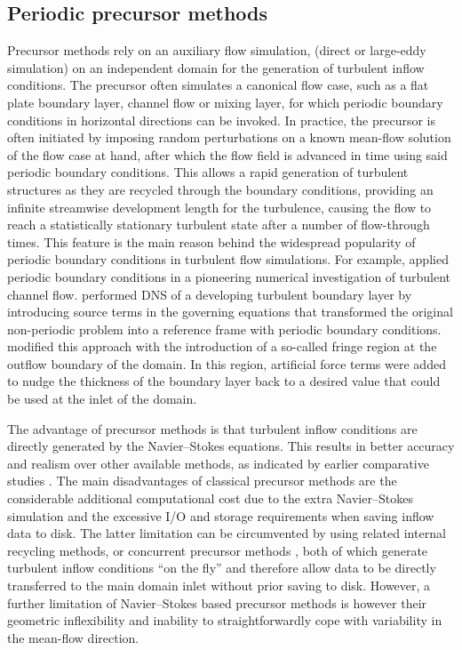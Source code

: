 	\subsection{Periodic precursor methods}
	Precursor methods rely on an auxiliary flow simulation, (direct or large-eddy simulation) on an independent domain for the generation of turbulent inflow conditions.
	The precursor often simulates a canonical flow case, such as a flat plate boundary layer, channel flow or mixing layer, for which periodic
	boundary conditions in horizontal directions can be invoked. In practice, the precursor is often initiated by imposing random perturbations on a known mean-flow solution of the flow case at hand, after which the flow field is advanced in time using said periodic boundary conditions. This allows a rapid generation of turbulent structures as they are recycled through the boundary conditions, providing an infinite streamwise development length for the turbulence, causing the flow to reach a statistically stationary turbulent state after a number of flow-through times. This feature is the main reason behind the widespread popularity of periodic boundary conditions in turbulent flow simulations. For example, \cite{kimmoin} applied
	periodic boundary conditions in a pioneering numerical investigation of turbulent channel flow. \cite{spalart1988direct} performed DNS of a developing turbulent boundary layer by introducing source terms in the governing equations that transformed the original non-periodic problem into a reference frame with periodic boundary conditions.  \cite{spalart1993experimental} modified this approach with the introduction of a so-called fringe region at the outflow boundary of the domain. In this region, artificial force terms were added to nudge the thickness of the boundary layer back to a desired value that could be used at the inlet of the domain.
	
	The advantage of precursor methods is that turbulent inflow conditions are directly generated by the Navier--Stokes equations. This results in
	better accuracy and realism over other available methods, as indicated by earlier comparative studies  \citep{keating2004priori,
	tabor2010inlet}. The main disadvantages of classical precursor methods are the considerable additional computational cost due to the extra
	Navier--Stokes simulation and the excessive I/O and storage requirements when saving inflow data to disk. The latter limitation can be
	circumvented by using related internal recycling methods, \cite[see,
	e.g.,][]{lund1998generation,mayor2002application,ferrante2004robust,araya2009inlet,araya2011dynamic} or concurrent precursor methods
	\citep{stevens2014large,stevens2014concurrent}, both of which generate turbulent inflow conditions ``on the fly'' and therefore allow data to
	be directly transferred to the main domain inlet without prior saving to disk. However, a further limitation of Navier--Stokes based precursor methods is however their geometric inflexibility and inability to straightforwardly cope with variability in the mean-flow direction. 
	
